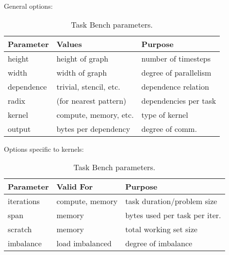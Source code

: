 \begin{table}[t]
\small

General options:

\vspace{0.25em}

\begin{tabular}{l | l | l}
Parameter & Values & Purpose \\
\hline

height & height of graph & number of timesteps \\
width & width of graph & degree of parallelism \\
dependence & trivial, stencil, etc. & dependence relation \\
\quad \raisebox{0.35ex}{$\llcorner$} radix & (for nearest pattern) & dependencies per task \\
kernel & compute, memory, etc. & type of kernel \\
output & bytes per dependency & degree of comm.
\end{tabular}

\vspace{1em}

Options specific to kernels:

\vspace{0.25em}

\begin{tabular}{l | l | l}
Parameter & Valid For & Purpose \\
\hline
iterations & compute, memory & task duration/problem size \\
span & memory & bytes used per task per iter. \\
scratch & memory & total working set size \\
imbalance & load imbalanced & degree of imbalance
\end{tabular}

\caption{Task Bench parameters.\label{tab:parameters}}
\vspace{-0.75cm}
\end{table}
